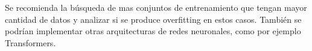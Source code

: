 \documentclass[12pt]{article}
\begin{document}
Se recomienda la b\'usqueda de mas conjuntos de entrenamiento que tengan mayor cantidad de datos y analizar si se produce overfitting en estos casos. Tambi\'en se podr\'ian implementar otras arquitecturas de redes neuronales, como por ejemplo Transformers.





\end{document}
